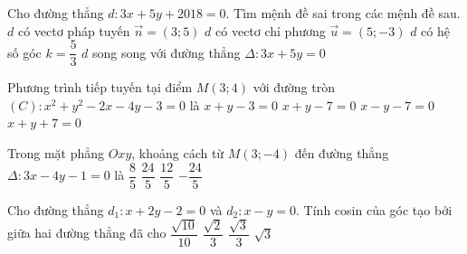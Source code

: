\begin{ex}%
	Cho đường thẳng $d \colon 3x+5y+2018=0$. Tìm mệnh đề sai trong các mệnh đề sau.
	\choice
	{$d$ có vectơ pháp tuyến $\overrightarrow{n}=(3;5)$}
	{$d$ có vectơ chỉ phương $\overrightarrow{u}=(5;-3)$}
	{$d$ có hệ số góc $k=\dfrac{5}{3}$}
	{\True $d$ song song với đường thẳng $\Delta \colon3x+5y=0$}
\end{ex}
\begin{ex}%
	Phương trình tiếp tuyến tại điểm $M(3;4)$ với đường tròn $(C) \colon x^2+y^2-2x-4y-3=0$ là
	\choice
	{$x+y-3=0$}
	{\True $x+y-7=0$}
	{$x-y-7=0$}
	{$x+y+7=0$}
\end{ex}
\begin{ex}%
	Trong mặt phẳng $Oxy$, khoảng cách từ $M(3;-4)$ đến đường thẳng $\Delta \colon 3x-4y-1=0$ là
	\choice
	{$\dfrac{8}{5}$}
	{\True $\dfrac{24}{5}$}
	{$\dfrac{12}{5}$}
	{$-\dfrac{24}{5}$}
\end{ex}
\begin{ex}%
	Cho đường thẳng $d_{1} \colon x+2y-2=0$ và $d_{2} \colon x-y=0$. Tính cosin của góc tạo bởi giữa hai đường thẳng đã cho
	\choice
	{\True $\dfrac{\sqrt{10}}{10}$}
	{$\dfrac{\sqrt{2}}{3}$}
	{$\dfrac{\sqrt{3}}{3}$}
	{$\sqrt{3}$}
\end{ex}

